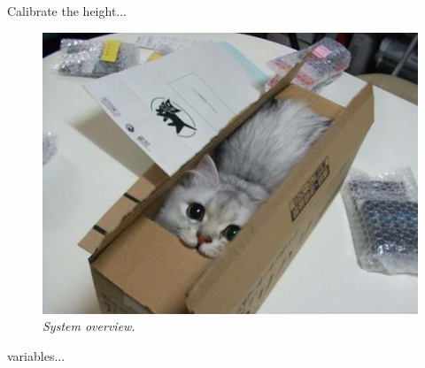 Calibrate the height...

\begin{figure}[htb]
	\centering
	\includegraphics[width=\linewidth]{images/boxcat.jpg}
	\caption[Overview of the entire system]{\textit{System overview.}}
	\label{fig:system_overview}  %
\end{figure}

variables...